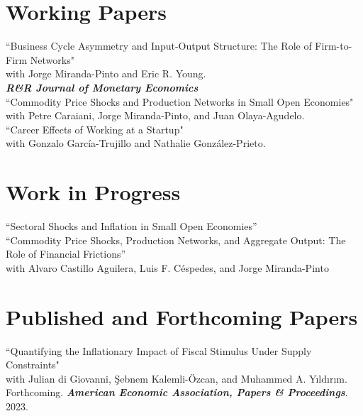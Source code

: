 \documentclass[11pt]{article}
\begin{document}
\section*{Working Papers}
``Business Cycle Asymmetry and Input-Output Structure: The Role of Firm-to-Firm Networks"\\
 with Jorge Miranda-Pinto and Eric R. Young.\\
 \textbf{\textit{R\&R Journal of Monetary Economics}}\\[-0.1in]

``Commodity Price Shocks and Production Networks in Small Open Economies"\\
 with Petre Caraiani, Jorge Miranda-Pinto, and Juan Olaya-Agudelo.\\[-0.1in]

 ``Career Effects of Working at a Startup"\\
 with Gonzalo Garc\'ia-Trujillo and Nathalie Gonz\'alez-Prieto.

\section*{Work in Progress}

``Sectoral Shocks and Inflation in Small Open Economies''\\[-0.1in]

``Commodity Price Shocks, Production Networks, and Aggregate Output: The Role of Financial Frictions''\\
with Alvaro Castillo Aguilera, Luis F. C\'espedes, and Jorge Miranda-Pinto\\[-0.1in]









\section*{Published and Forthcoming Papers}

``Quantifying the Inflationary Impact of Fiscal Stimulus Under Supply Constraints"\\
with Julian di Giovanni, \c{S}ebnem Kalemli-\"{O}zcan, and Muhammed A. Y{\i}ld{\i}r{\i}m. \\
Forthcoming. \textbf{\textit{American Economic Association, Papers \& Proceedings}}. 2023.\\[-0.1in]
\end{document}
